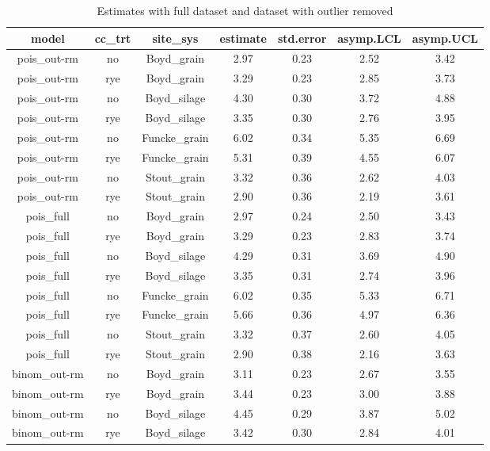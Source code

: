 \documentclass[]{article}
\begin{document}
\begin{table}[H]

\caption{\label{tab:unnamed-chunk-6}Estimates with full dataset and dataset with outlier removed}
\centering
\begin{tabular}[t]{ccccccc}
\toprule
model & cc\_trt & site\_sys & estimate & std.error & asymp.LCL & asymp.UCL\\
\midrule
\rowcolor{gray!6}  pois\_out-rm & no & Boyd\_grain & 2.97 & 0.23 & 2.52 & 3.42\\
pois\_out-rm & rye & Boyd\_grain & 3.29 & 0.23 & 2.85 & 3.73\\
\rowcolor{gray!6}  pois\_out-rm & no & Boyd\_silage & 4.30 & 0.30 & 3.72 & 4.88\\
pois\_out-rm & rye & Boyd\_silage & 3.35 & 0.30 & 2.76 & 3.95\\
\rowcolor{gray!6}  pois\_out-rm & no & Funcke\_grain & 6.02 & 0.34 & 5.35 & 6.69\\
\addlinespace
pois\_out-rm & rye & Funcke\_grain & 5.31 & 0.39 & 4.55 & 6.07\\
\rowcolor{gray!6}  pois\_out-rm & no & Stout\_grain & 3.32 & 0.36 & 2.62 & 4.03\\
pois\_out-rm & rye & Stout\_grain & 2.90 & 0.36 & 2.19 & 3.61\\
\rowcolor{gray!6}  pois\_full & no & Boyd\_grain & 2.97 & 0.24 & 2.50 & 3.43\\
pois\_full & rye & Boyd\_grain & 3.29 & 0.23 & 2.83 & 3.74\\
\addlinespace
\rowcolor{gray!6}  pois\_full & no & Boyd\_silage & 4.29 & 0.31 & 3.69 & 4.90\\
pois\_full & rye & Boyd\_silage & 3.35 & 0.31 & 2.74 & 3.96\\
\rowcolor{gray!6}  pois\_full & no & Funcke\_grain & 6.02 & 0.35 & 5.33 & 6.71\\
pois\_full & rye & Funcke\_grain & 5.66 & 0.36 & 4.97 & 6.36\\
\rowcolor{gray!6}  pois\_full & no & Stout\_grain & 3.32 & 0.37 & 2.60 & 4.05\\
\addlinespace
pois\_full & rye & Stout\_grain & 2.90 & 0.38 & 2.16 & 3.63\\
\rowcolor{gray!6}  binom\_out-rm & no & Boyd\_grain & 3.11 & 0.23 & 2.67 & 3.55\\
binom\_out-rm & rye & Boyd\_grain & 3.44 & 0.23 & 3.00 & 3.88\\
\rowcolor{gray!6}  binom\_out-rm & no & Boyd\_silage & 4.45 & 0.29 & 3.87 & 5.02\\
binom\_out-rm & rye & Boyd\_silage & 3.42 & 0.30 & 2.84 & 4.01\\

\end{tabular}
\end{table}
\end{document}
